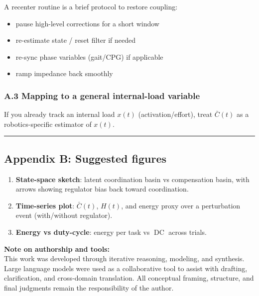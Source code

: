 \documentclass[11pt]{article}
\providecommand{\tightlist}{%
  \setlength{\itemsep}{0pt}\setlength{\parskip}{0pt}}
\begin{document}
A recenter routine is a brief protocol to restore coupling:

\begin{itemize}
\tightlist
\item
  pause high-level corrections for a short window
\item
  re-estimate state / reset filter if needed
\item
  re-sync phase variables (gait/CPG) if applicable
\item
  ramp impedance back smoothly
\end{itemize}

\hypertarget{a.3-mapping-to-a-general-internal-load-variable}{%
\subsubsection{A.3 Mapping to a general internal-load variable}\label{a.3-mapping-to-a-general-internal-load-variable}}

If you already track an internal load \(x(t)\) (activation/effort), treat \(\bar C(t)\) as a robotics-specific estimator of \(x(t)\).

\begin{center}\rule{0.5\linewidth}{0.5pt}\end{center}

\hypertarget{appendix-b-suggested-figures}{%
\subsection{Appendix B: Suggested figures}\label{appendix-b-suggested-figures}}

\begin{enumerate}
\def\labelenumi{\arabic{enumi})}
\tightlist
\item
  \textbf{State-space sketch}: latent coordination basin vs compensation basin, with arrows showing regulator bias back toward coordination.
\item
  \textbf{Time-series plot}: \(\bar C(t)\), \(H(t)\), and energy proxy over a perturbation event (with/without regulator).
\item
  \textbf{Energy vs duty-cycle}: energy per task vs \(\operatorname{DC}\) across trials.
\end{enumerate}
\newpage

{
\noindent\textbf{Note on authorship and tools:}\\
This work was developed through iterative reasoning, modeling, and synthesis.
Large language models were used as a collaborative tool to assist with drafting,
clarification, and cross-domain translation. All conceptual framing, structure,
and final judgments remain the responsibility of the author.
}
\end{document}
